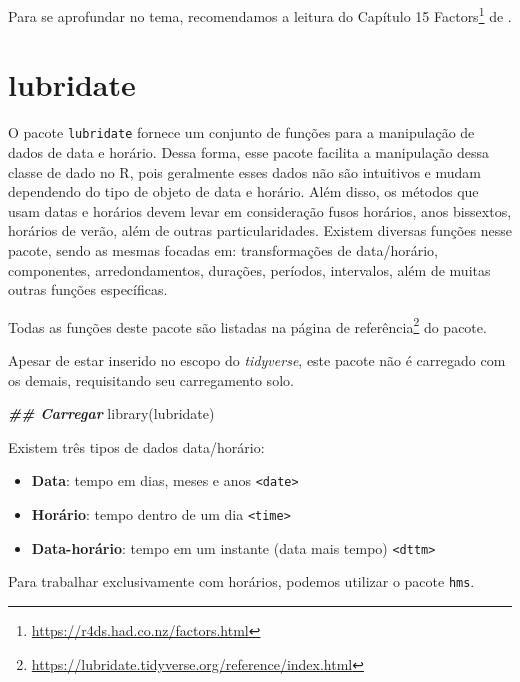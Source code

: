 \documentclass[
]{book}
\newenvironment{Shaded}{\begin{snugshade}}{\end{snugshade}}
\newcommand{\DocumentationTok}[1]{\textcolor[rgb]{0.37,0.37,0.37}{\textbf{\textit{#1}}}}
\newcommand{\FunctionTok}[1]{\textcolor[rgb]{0,0,0}{#1}}
\newcommand{\NormalTok}[1]{#1}
\providecommand{\tightlist}{%
  \setlength{\itemsep}{0pt}\setlength{\parskip}{0pt}}
\renewcommand{\href}[2]{#2\footnote{\url{#1}}}
\begin{document}
Para se aprofundar no tema, recomendamos a leitura do Capítulo \href{https://r4ds.had.co.nz/factors.html}{15 Factors} de \citet{wickham2017}.

\hypertarget{lubridate}{%
\section{lubridate}\label{lubridate}}

O pacote \texttt{lubridate} fornece um conjunto de funções para a manipulação de dados de data e horário. Dessa forma, esse pacote facilita a manipulação dessa classe de dado no R, pois geralmente esses dados não são intuitivos e mudam dependendo do tipo de objeto de data e horário. Além disso, os métodos que usam datas e horários devem levar em consideração fusos horários, anos bissextos, horários de verão, além de outras particularidades. Existem diversas funções nesse pacote, sendo as mesmas focadas em: transformações de data/horário, componentes, arredondamentos, durações, períodos, intervalos, além de muitas outras funções específicas.

Todas as funções deste pacote são listadas na \href{https://lubridate.tidyverse.org/reference/index.html}{página de referência} do pacote.

Apesar de estar inserido no escopo do \emph{tidyverse}, este pacote não é carregado com os demais, requisitando seu carregamento solo.

\begin{Shaded}
\begin{Highlighting}[]
\DocumentationTok{\#\# Carregar}
\FunctionTok{library}\NormalTok{(lubridate)}
\end{Highlighting}
\end{Shaded}

Existem três tipos de dados data/horário:

\begin{itemize}
\tightlist
\item
  \textbf{Data}: tempo em dias, meses e anos \texttt{\textless{}date\textgreater{}}
\item
  \textbf{Horário}: tempo dentro de um dia \texttt{\textless{}time\textgreater{}}
\item
  \textbf{Data-horário}: tempo em um instante (data mais tempo) \texttt{\textless{}dttm\textgreater{}}
\end{itemize}

Para trabalhar exclusivamente com horários, podemos utilizar o pacote \texttt{hms}.
\end{document}
